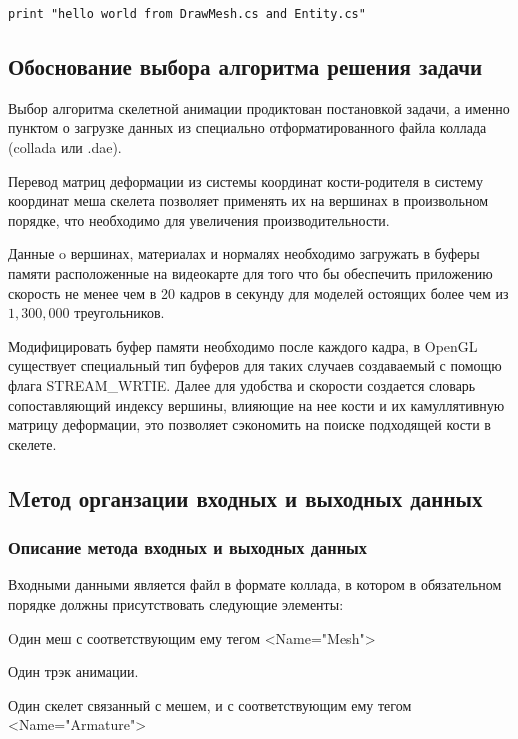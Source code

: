 \begin{lstlisting}
print "hello world from DrawMesh.cs and Entity.cs"
\end{lstlisting}


\subsection{Обоснование выбора алгоритма решения задачи}
Выбор алгоритма скелетной анимации продиктован постановкой задачи, а именно пунктом о загрузке данных из специально отформатированного файла коллада (collada или .dae).

Перевод матриц деформации из системы координат кости-родителя в систему координат меша скелета позволяет применять их на вершинах в произвольном порядке, что необходимо для увеличения производительности. 

Данные o вершинах, материалах и нормалях необходимо загружать в буферы памяти расположенные на видеокарте для того что бы обеспечить приложению скорость не менее чем в 20 кадров в секунду для моделей остоящих более чем из $1,300,000$ треугольников.

Модифицировать буфер памяти необходимо после каждого кадра, в OpenGL существует специальный тип буферов для таких случаев создаваемый с помощю флага STREAM\_WRTIE. Далее для удобства и скорости создается словарь сопоставляющий индексу вершины, влияющие на нее кости и их камуллятивную матрицу деформации, это позволяет сэкономить на поиске подходящей кости в скелете.

\subsection{Mетод органзации входных и выходных данных}

\subsubsection{Описание метода входных и выходных данных}
Входными данными является файл в формате коллада, в котором в обязательном порядке должны присутствовать следующие элементы:
\begin{my_enumerate}
\item Oдин меш с соответствующим ему тегом <Name="Mesh">
\item Один трэк анимации.
\item Один скелет связанный с мешем, и с соответствующим ему тегом <Name="Armature">
\end{my_enumerate}

